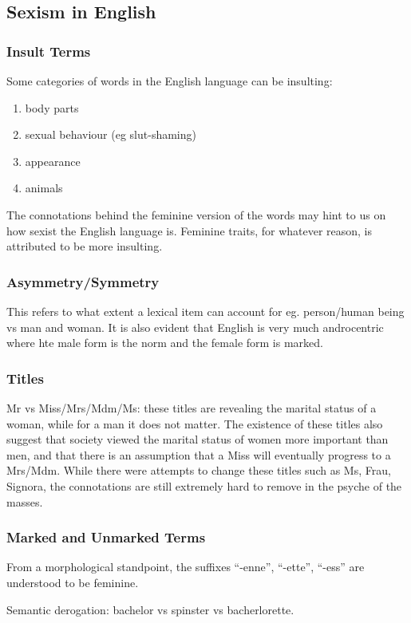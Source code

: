 \documentclass[../main.tex]{subfiles}
\begin{document}
        \subsection{Sexism in English}
            \subsubsection{Insult Terms}
            Some categories of words in the English language can be insulting: \begin{enumerate}
                \item body parts
                \item sexual behaviour (eg slut-shaming)
                \item appearance
                \item animals
            \end{enumerate}
            The connotations behind the feminine version of the words may hint to us on how sexist the English language is. Feminine traits, for whatever reason, is attributed to be more insulting.

            \subsubsection{Asymmetry/Symmetry}
            This refers to what extent a lexical item can account for eg. person/human being vs man and woman. It is also evident that English is very much androcentric where hte male form is the norm and the female form is marked. 

            \subsubsection{Titles}
            Mr vs Miss/Mrs/Mdm/Ms: these titles are revealing the marital status of a woman, while for a man it does not matter. The existence of these titles also suggest that society viewed the marital status of women more important than men, and that there is an assumption that a Miss will eventually progress to a Mrs/Mdm. While there were attempts to change these titles such as Ms, Frau, Signora, the connotations are still extremely hard to remove in the psyche of the masses. 

            \subsubsection{Marked and Unmarked Terms}
            From a morphological standpoint, the suffixes ``-enne'', ``-ette'', ``-ess'' are understood to be feminine. \par
            Semantic derogation: bachelor vs spinster vs bacherlorette.
\end{document}
